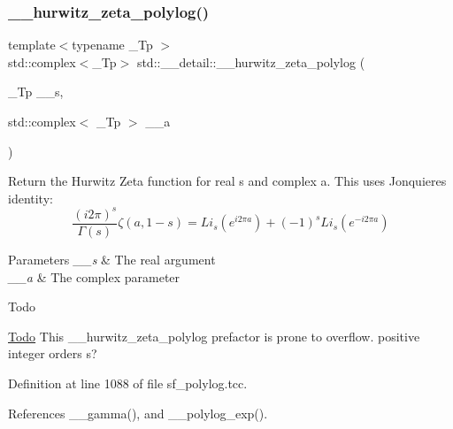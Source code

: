 \mbox{\label{namespacestd_1_1____detail_a7c45415c3ec0e137eea2364a6dd3af4e}} 
\subsubsection{\texorpdfstring{\+\_\+\+\_\+hurwitz\+\_\+zeta\+\_\+polylog()}{\_\_hurwitz\_zeta\_polylog()}}
{\footnotesize\ttfamily template$<$typename \+\_\+\+Tp $>$ \\
std\+::complex$<$\+\_\+\+Tp$>$ std\+::\+\_\+\+\_\+detail\+::\+\_\+\+\_\+hurwitz\+\_\+zeta\+\_\+polylog (\begin{DoxyParamCaption}\item[{\+\_\+\+Tp}]{\+\_\+\+\_\+s,  }\item[{std\+::complex$<$ \+\_\+\+Tp $>$}]{\+\_\+\+\_\+a }\end{DoxyParamCaption})}

Return the Hurwitz Zeta function for real s and complex a. This uses Jonquiere\textquotesingle{}s identity\+: \[ \frac{(i2\pi)^s}{\Gamma(s)}\zeta(a,1-s) = Li_s(e^{i2\pi a}) + (-1)^s Li_s(e^{-i2\pi a}) \] 
\begin{DoxyParams}{Parameters}
{\em \+\_\+\+\_\+s} & The real argument \\
\hline
{\em \+\_\+\+\_\+a} & The complex parameter \\
\hline
\end{DoxyParams}
\begin{DoxyRefDesc}{Todo}
\item[\hyperlink{todo__todo000013}{Todo}]This \+\_\+\+\_\+hurwitz\+\_\+zeta\+\_\+polylog prefactor is prone to overflow. positive integer orders s? \end{DoxyRefDesc}


Definition at line 1088 of file sf\+\_\+polylog.\+tcc.



References \+\_\+\+\_\+gamma(), and \+\_\+\+\_\+polylog\+\_\+exp().

\mbox{\label{namespacestd_1_1____detail_aba60bcf9f002dc900042065999546bc9}} 
